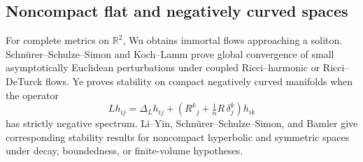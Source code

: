\subsection{Noncompact flat and negatively curved spaces}

For complete metrics on $\mathbb R^2$, Wu obtains immortal flows approaching a
soliton.  Schn\"urer--Schulze--Simon and Koch--Lamm prove global convergence of
small asymptotically Euclidean perturbations under coupled Ricci--harmonic or
Ricci--DeTurck flows.  Ye proves stability on compact negatively curved
manifolds when the operator
\[
 Lh_{ij}=\Delta_Lh_{ij}+\left(R^k{}_j+\tfrac1nR\,\delta^k_j\right)h_{ik}
\]
has strictly negative spectrum.  Li--Yin, Schn\"urer--Schulze--Simon, and Bamler
give corresponding stability results for noncompact hyperbolic and symmetric
spaces under decay, boundedness, or finite-volume hypotheses.
